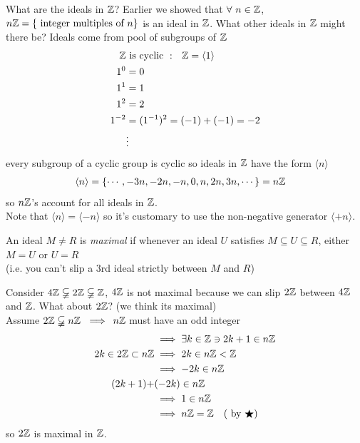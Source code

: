 \begin{example}
    What are the ideals in ${\mathbb{ Z}}$? Earlier we showed that $\forall \ n\in {\mathbb{ Z}}$, $n{\mathbb{ Z}}=\{ \text{ integer multiples of }n\}$ is an ideal in ${\mathbb{ Z}}$. What other ideals in ${\mathbb{ Z}}$ might there be? Ideals come from pool of subgroups of ${\mathbb{ Z}}$
    \begin{align}
        {\mathbb{ Z}} &\text{ is cyclic }: \ \ {\mathbb{ Z}}=\langle 1 \rangle \nonumber \\
        1^0&=0 \nonumber \\
        1^1&=1 \nonumber \\
        1^2&=2 \nonumber \\
        1^{-2}&= (1^{-1})^2 = (-1)+(-1)=-2 \nonumber \\
        &\vdots \nonumber
    \end{align}
    every subgroup of a cyclic group is cyclic so ideals in ${\mathbb{ Z}}$ have the form $\langle n \rangle$
    \begin{align}
        \langle n \rangle &= \{\cdots, -3n, -2n, -n, 0, n, 2n, 3n, \cdots\} = n{\mathbb{ Z}} \nonumber
    \end{align}
    so $n{\mathbb{ Z}}$'s account for all ideals in ${\mathbb{ Z}}$. \\ \steezybreak 
    Note that $\langle n \rangle = \langle -n \rangle$ so it's customary to use the non-negative generator $\langle +n \rangle$.
\end{example}
\begin{definition}
    An ideal $M\neq R$ is \textit{maximal} if whenever an ideal $U$ satisfies $M\subseteq U \subseteq R$, either $M=U$ or $U=R$ \\ 
    
    \noindent (i.e. you can't slip a 3rd ideal strictly between $M$ and $R$)
\end{definition}
\begin{example}
    Consider $4{\mathbb{ Z}} \varsubsetneqq 2{\mathbb{ Z}} \varsubsetneqq {\mathbb{ Z}}$, $4{\mathbb{ Z}}$ is not maximal because we can slip $2{\mathbb{ Z}}$ between $4{\mathbb{ Z}}$ and ${\mathbb{ Z}}$. What about $2{\mathbb{ Z}}$? (we think its maximal) \\ \steezybreak
    Assume $2\Z \varsubsetneqq n\Z \ \implies$ $n{\mathbb{ Z}}$ must have an odd integer
    \begin{align}
        &\implies \exists k \in {\mathbb{ Z}} \ni 2k+1 \in n{\mathbb{ Z}} \nonumber \\
        2k \in 2{\mathbb{ Z}} \subset n{\mathbb{ Z}} &\implies 2k \in n{\mathbb{ Z}} < {\mathbb{ Z}} \nonumber \\
        &\implies -2k \in n{\mathbb{ Z}} \nonumber \\
        (2k+1)+&(-2k) \in n{\mathbb{ Z}}  \nonumber \\
        &\implies 1\in n{\mathbb{ Z}} \nonumber \\
        &\implies n{\mathbb{ Z}} = {\mathbb{ Z}} \ \ \ (\text{ by }\bigstar) \nonumber
    \end{align}
    so $2{\mathbb{ Z}}$ is maximal in ${\mathbb{ Z}}$.
\end{example}
